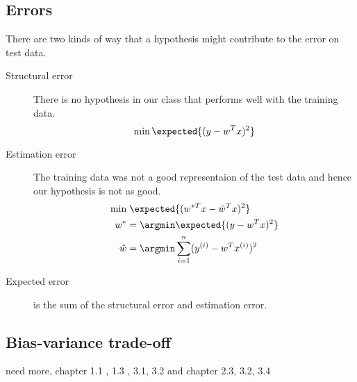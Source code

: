 \subsection{Errors}
There are two kinds of way that a hypothesis might contribute to the error on test data.
\begin{description}
    \item [Structural error] There is no hypothesis in our class that performs well with the training data.
    \begin{equation*}
        \min \expected{(y - w^Tx)^2}
    \end{equation*}
    \item [Estimation error] The training data was not a good representaion of the test data and hence our hypothesis is not as good.
    \begin{align*}
        \min &\; \expected{(w^{\ast T} x - \hat{w}^T x)^2}\\
        w^\ast &= \argmin \expected{(y - w^Tx)^2}\\
        \hat{w} &= \argmin \sum_{i= 1}^{n} (y^{(i)} - w^T x^{(i)})^2 
    \end{align*}
    \item [Expected error] is the sum of the structural error and estimation error.
\end{description}
\subsection{Bias-variance trade-off}
need more, chapter 1.1 , 1.3 , 3.1, 3.2 and chapter 2.3, 3.2, 3.4